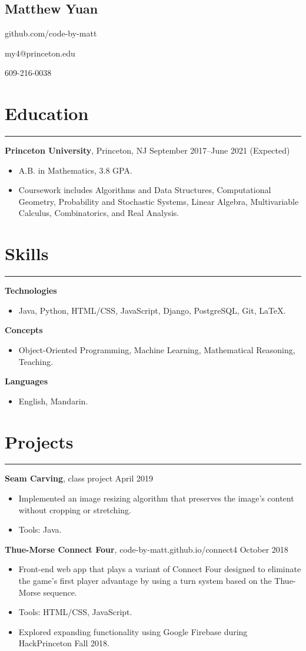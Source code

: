 \documentclass[11pt]{article}
\newcommand{\name}[1]{\begin{center}\section*{\huge #1}\end{center}}
\newcommand{\topinfo}[1]{\begin{center}\vspace{-0.2cm}#1\vspace{-0.2cm}\end{center}}
\newcommand{\resumesection}[1]{\vspace{-0.2cm}\section*{#1}\vspace{-0.2cm}\hrule\vspace{0.2cm}}
\begin{document}
\name{Matthew Yuan}
\topinfo{github.com/code-by-matt}
\topinfo{my4@princeton.edu}
\topinfo{609-216-0038}

\resumesection{Education}

\textbf{Princeton University}, Princeton, NJ \hfill September 2017--June 2021 (Expected)
\begin{itemize}
	\item A.B. in Mathematics, 3.8 GPA.
	\item Coursework includes Algorithms and Data Structures, Computational Geometry, Probability and Stochastic Systems, Linear Algebra, Multivariable Calculus, Combinatorics, and Real Analysis.
\end{itemize}

\resumesection{Skills}

\textbf{Technologies}
\begin{itemize}
	\item Java, Python, HTML/CSS, JavaScript, Django, PostgreSQL, Git, LaTeX.
\end{itemize}

\textbf{Concepts}
\begin{itemize}
	\item Object-Oriented Programming, Machine Learning, Mathematical Reasoning, Teaching.
\end{itemize}

\textbf{Languages}
\begin{itemize}
	\item English, Mandarin.
\end{itemize}

\resumesection{Projects}

\textbf{Seam Carving}, class project \hfill April 2019
\begin{itemize}
	\item Implemented an image resizing algorithm that preserves the image's content without cropping or stretching.
	\item Tools: Java.
\end{itemize}

\textbf{Thue-Morse Connect Four}, code-by-matt.github.io/connect4 \hfill October 2018
\begin{itemize}
	\item Front-end web app that plays a variant of Connect Four designed to eliminate the game's first player advantage by using a turn system based on the Thue-Morse sequence.
	\item Tools: HTML/CSS, JavaScript.
	\item Explored expanding functionality using Google Firebase during HackPrinceton Fall 2018.
\end{itemize}
\end{document}
